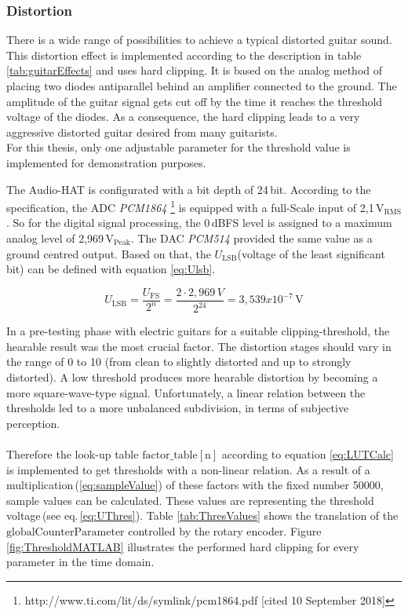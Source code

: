 \fbox{

}

\subsubsection{Distortion}

There is a wide range of possibilities to achieve a typical distorted guitar sound.
This distortion effect is implemented according to the description in table  \ref{tab:guitarEffects} and uses hard clipping. It is based on the analog method of placing two diodes antiparallel behind an amplifier connected to the ground. The amplitude of the guitar signal gets cut off by the time it reaches the threshold voltage of the diodes. As a consequence, the hard clipping leads to a very aggressive distorted guitar desired from many guitarists.\\
For this thesis, only one adjustable parameter for the threshold value is implemented for demonstration purposes.

The Audio-HAT is configurated with a bit depth of 24\,bit. According to the specification, the ADC \textit{PCM1864} \footnote{http://www.ti.com/lit/ds/symlink/pcm1864.pdf [cited 10 September 2018]} is equipped with a full-Scale input of 2,1\,V$_{\mathrm{RMS}}$.
So for the digital signal processing, the 0\,dBFS level is assigned to a maximum analog level of 2,969\,V$_{\mathrm{Peak}}$.
The DAC \textit{PCM514} provided the same value as a ground centred output. 
Based on that, the $U_{\mathrm{LSB}}$(voltage of the least significant bit) can be defined with equation \ref{eq:Ulsb}.


\begin{equation}
U_{\mathrm{LSB}} = \frac{U_{\mathrm{FS}}}{2^n}  = \frac{2 \cdot 2,969\,V}{2^{24}} = 3,539x10^{-7}\,\mathrm{V}
\label{eq:Ulsb}
\end{equation}

In a pre-testing phase with electric guitars for a suitable clipping-threshold, the hearable result was the most crucial factor. The distortion stages should vary in the range of 0 to 10 (from clean to slightly distorted and up to strongly distorted). A low threshold produces more hearable distortion by becoming a more square-wave-type signal.
Unfortunately, a linear relation between the thresholds led to a more unbalanced subdivision, in terms of subjective perception.\\
\\
Therefore the look-up table $\mathrm{factor\_table[n]}$ according to equation \ref{eq:LUTCalc} is implemented to get thresholds with a non-linear relation. As a result of a multiplication\,(\ref{eq:sampleValue}) of these factors with the fixed number 50000, sample values can be calculated. These values are representing the threshold voltage\,(see eq.\,\ref{eq:UThres}). 
Table \ref{tab:ThresValues} shows the translation of the $\mathrm{globalCounterParameter}$ controlled by the rotary encoder. Figure \ref{fig:ThresholdMATLAB} illustrates the performed hard clipping for every parameter in the time domain.


